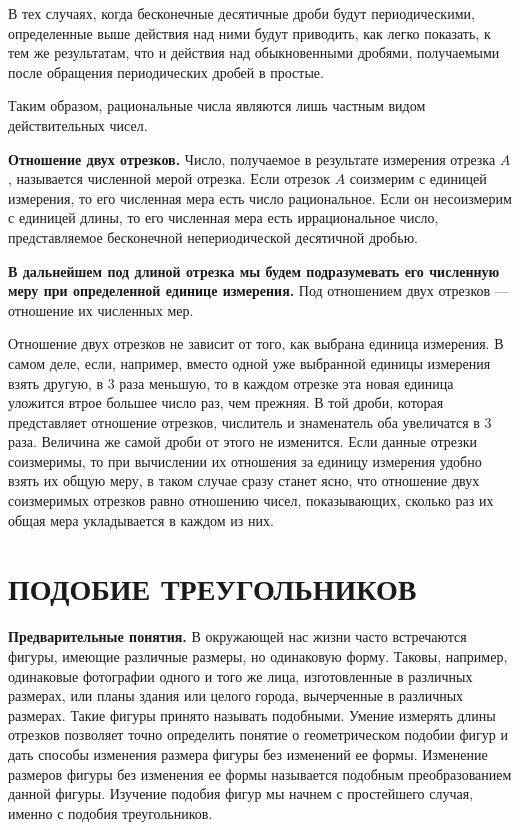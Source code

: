 \documentclass[oneside]{book}
\begin{document}
В тех случаях, когда бесконечные десятичные дроби будут периодическими, определенные выше действия над ними будут приводить, как легко показать, к тем же результатам, что и действия над обыкновенными дробями, получаемыми после обращения периодических дробей в простые.

Таким образом, рациональные числа являются лишь частным видом действительных чисел.

\textbf{Отношение двух отрезков.}
Число, получаемое в результате измерения отрезка $A$, называется численной мерой отрезка.
Если отрезок $A$ соизмерим с единицей измерения, то его численная мера есть число рациональное.
Если он несоизмерим с единицей длины, то его численная мера есть иррациональное число, представляемое бесконечной непериодической десятичной дробью.

\textbf{В дальнейшем под длиной отрезка мы будем подразумевать его численную меру при определенной единице измерения.}
Под отношением двух отрезков — отношение их численных мер.

Отношение двух отрезков не зависит от того, как выбрана единица измерения.
В самом деле, если, например, вместо одной уже выбранной единицы измерения взять другую, в 3 раза меньшую, то в каждом отрезке эта новая единица уложится втрое большее число раз, чем прежняя.
В той дроби, которая представляет отношение отрезков, числитель и знаменатель оба увеличатся в 3 раза.
Величина же самой дроби от этого не изменится.
Если данные отрезки соизмеримы, то при вычислении их отношения за единицу измерения удобно взять их общую меру, в таком случае сразу станет ясно, что отношение двух соизмеримых отрезков равно отношению чисел, показывающих, сколько раз их общая мера укладывается в каждом из них.

\section{ПОДОБИЕ ТРЕУГОЛЬНИКОВ}

\textbf{Предварительные понятия.}
В окружающей нас жизни часто встречаются фигуры, имеющие различные размеры, но одинаковую форму.
Таковы, например, одинаковые фотографии одного и того же лица, изготовленные в различных размерах, или планы здания или целого города, вычерченные в различных размерах. %
Такие фигуры принято называть подобными.
Умение измерять длины отрезков позволяет точно определить понятие о геометрическом подобии фигур и дать способы изменения размера фигуры без изменений ее формы.
Изменение размеров фигуры без изменения ее формы называется подобным преобразованием данной фигуры.
Изучение подобия фигур мы начнем с простейшего случая, именно с подобия треугольников.
\end{document}
